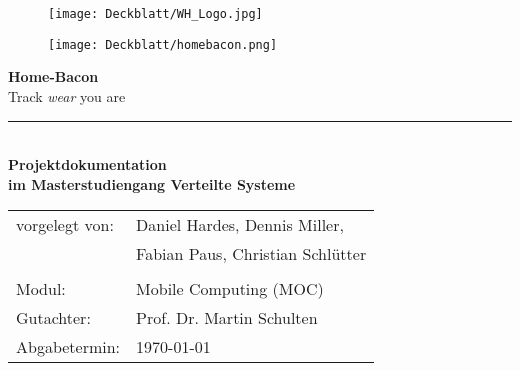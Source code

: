 \thispagestyle{plain}
\begin{titlepage}

\begin{center}
\centering
\begin{figure}
\begin{minipage}{0.65\textwidth}
\texttt{[image: Deckblatt/WH\_Logo.jpg]}
\end{minipage}
\qquad
\begin{minipage}{0.25\textwidth}
\texttt{[image: Deckblatt/homebacon.png]}
\end{minipage}
\end{figure}

\vspace*{2cm}

\Huge{\textbf{Home-Bacon}}\\
\Large{Track \textit{wear} you are}\\
\rule{\textwidth}{0.4pt}\\[3.0ex]

\Large{\textbf{Projektdokumentation}}\\[1.5ex]
\large{\textbf{im Masterstudiengang Verteilte Systeme}}\\[3.0ex]

\normalsize
\begin{tabular}{ll}\\
	vorgelegt von: 
	& \quad Daniel Hardes,  Dennis Miller, \\[1.2ex]
	& \quad Fabian Paus, Christian Schlütter\\[1.2ex]
	& \quad \\[1.2ex]
	Modul:  & \quad Mobile Computing (MOC) \\[1.2ex]
	Gutachter:  & \quad Prof. Dr. Martin Schulten \\[1.2ex]
	Abgabetermin:  & \quad \today\\[1.2ex]
\end{tabular}

\end{center}

\end{titlepage}
